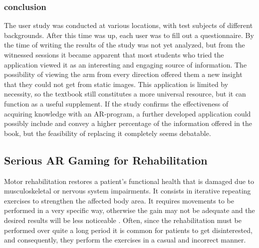 \subsubsection{conclusion}
The user study was conducted at various locations, with test subjects of different backgrounds. 
After this time was up, each user was to fill out a questionnaire.
By the time of writing the results of the study was not yet analyzed, but from the witnessed sessions it became apparent that most students who tried the application viewed it as an interesting and engaging source of information. The possibility of viewing the arm from every direction offered them a new insight that they could not get from static images. This application is limited by necessity, so the textbook still constitutes a more universal resource, but it can function as a useful supplement. If the study confirms the effectiveness of acquiring knowledge with an AR-program, a further developed application could possibly include and convey a higher percentage of the information offered in the book, but the feasibility of replacing it completely seems debatable.

\subsection{Serious AR Gaming for Rehabilitation} \label{sec:3-IMR:gaming}
Motor rehabilitation restores a patient's functional health that is damaged due to musculoskeletal or nervous system impairments. It consists in iterative repeating exercises to strengthen the affected body area. It requires movements to be performed in a very specific way, otherwise the gain may not be adequate and the desired results will be less noticeable \cite{Merians2006,Ustinova2014}. Often, since the rehabilitation must be performed over quite a long period it is common for patients to get disinterested, and consequently, they perform the exercises in a casual and incorrect manner. 


